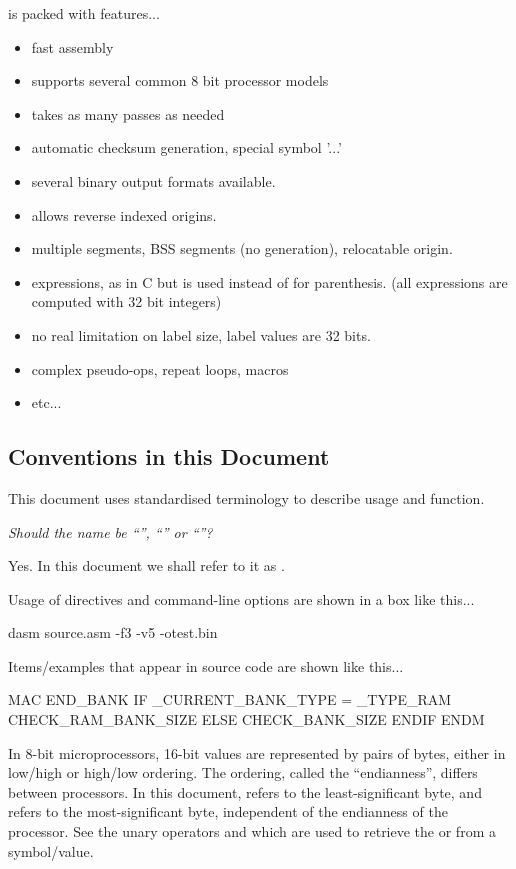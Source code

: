 \dasm is packed with features...

\begin{itemize}
	\item fast assembly
\item supports several common 8 bit processor models
\item takes as many passes as needed
\item automatic checksum generation, special symbol '...'
\item several binary output formats available.
\item allows reverse indexed origins.
\item multiple segments, BSS segments (no generation), relocatable origin.
\item expressions, as in C but \mono{[]} is used instead of \mono{()} for parenthesis.
(all expressions are computed with 32 bit integers)
\item no real limitation on label size, label values are 32 bits.
\item complex pseudo-ops, repeat loops, macros
\item etc...
\end{itemize}




\subsection{Conventions in this Document}

This document uses standardised terminology to describe usage and function.

\textit{Should the name be ``'', ``'' or ``''?}

Yes. In this document we shall refer to it as \dasm.

Usage of directives and command-line options are shown in a box like this...

\begin{usage}
dasm source.asm -f3 -v5 -otest.bin
\end{usage}

Items/examples that appear in source code are shown like this...

\begin{code}
  MAC END_BANK
    IF _CURRENT_BANK_TYPE = _TYPE_RAM
      CHECK_RAM_BANK_SIZE
    ELSE
      CHECK_BANK_SIZE
    ENDIF
  ENDM
\end{code}

\label{change:lsbmsb}
In 8-bit microprocessors, 16-bit values are represented by pairs of bytes, either in low/high or high/low ordering. The ordering, called the ``endianness'', differs between processors. In this document,  refers to the least-significant byte, and  refers to the most-significant byte, independent of the endianness of the processor. See the unary operators \mono{<} and \mono{>} which are used to retrieve the  or  from a symbol/value.

